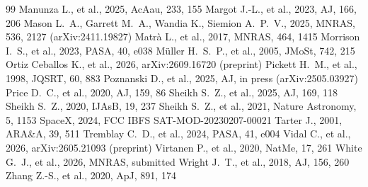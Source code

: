 \documentclass[twocolumn,twocolappendix]{openjournal}
\begin{document}
\begin{thebibliography}{99}
 Manunza L., et al., 2025, AcAau, 233, 155
 Margot J.-L., et al., 2023, AJ, 166, 206
 Mason L.~A., Garrett M.~A., Wandia K., Siemion A.~P.~V., 2025, MNRAS, 536, 2127 (arXiv:2411.19827)
 Matrà L., et al., 2017, MNRAS, 464, 1415
 Morrison I.~S., et al., 2023, PASA, 40, e038
 M\"uller H.~S.~P., et al., 2005, JMoSt, 742, 215
 Ortiz Ceballos K., et al., 2026, arXiv:2609.16720 (preprint)
 Pickett H.~M., et al., 1998, JQSRT, 60, 883
 Poznanski D., et al., 2025, AJ, in press (arXiv:2505.03927)
 Price D.~C., et al., 2020, AJ, 159, 86
 Sheikh S.~Z., et al., 2025, AJ, 169, 118
 Sheikh S.~Z., 2020, IJAsB, 19, 237
 Sheikh S.~Z., et al., 2021, Nature Astronomy, 5, 1153
 SpaceX, 2024, FCC IBFS SAT-MOD-20230207-00021
 Tarter J., 2001, ARA\&A, 39, 511
 Tremblay C.~D., et al., 2024, PASA, 41, e004
 Vidal C., et al., 2026, arXiv:2605.21093 (preprint)
 Virtanen P., et al., 2020, NatMe, 17, 261
 White G.~J., et al., 2026, MNRAS, submitted
 Wright J.~T., et al., 2018, AJ, 156, 260
 Zhang Z.-S., et al., 2020, ApJ, 891, 174
\end{thebibliography}
\end{document}
